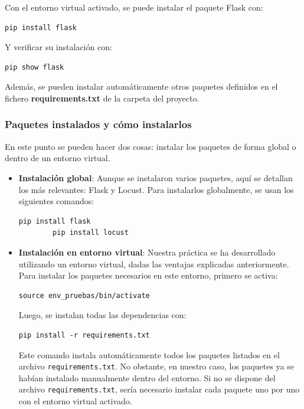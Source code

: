\documentclass[10pt]{book}
\begin{document}
    Con el entorno virtual activado, se puede instalar el paquete Flask con:
    
    \begin{lstlisting}[style=simplebash]
    pip install flask
    \end{lstlisting}
    
    Y verificar su instalación con:
    
    \begin{lstlisting}[style=simplebash]
    pip show flask
    \end{lstlisting}
    
    Además, se pueden instalar automáticamente otros paquetes definidos en el fichero \textbf{requirements.txt} de la carpeta del proyecto.
    
    \subsubsection{Paquetes instalados y cómo instalarlos}
    
    En este punto se pueden hacer dos cosas: instalar los paquetes de forma global o dentro de un entorno virtual.
    
    \begin{itemize}
        \item \textbf{Instalación global}: Aunque se instalaron varios paquetes, aquí se detallan los más relevantes: Flask y Locust. Para instalarlos globalmente, se usan los siguientes comandos:
    
        \begin{lstlisting}[style=simplebash]
        pip install flask
        pip install locust
        \end{lstlisting}
    
        \item \textbf{Instalación en entorno virtual}: Nuestra práctica se ha desarrollado utilizando un entorno virtual, dadas las ventajas explicadas anteriormente. Para instalar los paquetes necesarios en este entorno, primero se activa:
    
        \begin{lstlisting}[style=simplebash]
        source env_pruebas/bin/activate
        \end{lstlisting}
    
        Luego, se instalan todas las dependencias con:
    
        \begin{lstlisting}[style=simplebash]
        pip install -r requirements.txt
        \end{lstlisting}
    
        Este comando instala automáticamente todos los paquetes listados en el archivo \texttt{requirements.txt}. No obstante, en nuestro caso, los paquetes ya se habían instalado manualmente dentro del entorno. Si no se dispone del archivo \texttt{requirements.txt}, sería necesario instalar cada paquete uno por uno con el entorno virtual activado.
    \end{itemize}
\end{document}
